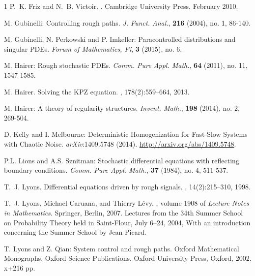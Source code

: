 \documentclass[11pt,reqno,oneside]{amsart}
\numberwithin{equation}{section}
\begin{document}
\begin{thebibliography}{1}
P.~K. Friz and N.~B. Victoir.
.
\newblock Cambridge University Press, February 2010.



M. Gubinelli: Controlling rough paths.  {\it J. Funct. Anal.},  {\bf 216}  (2004), no. 1, 86-140.



 M. Gubinelli, N. Perkowski and P. Imkeller: Paracontrolled distributions and singular PDEs. {\it Forum of Mathematics, Pi}, {\bf 3} (2015), no. 6.



M. Hairer: Rough stochastic PDEs.  {\it Comm. Pure Appl. Math.},  {\bf 64} (2011), no. 11, 1547-1585. 



M. Hairer.
\newblock Solving the {KPZ} equation.
, 178(2):559--664, 2013.



 M. Hairer: A theory of regularity structures. {\it Invent. Math.}, {\bf 198} (2014), no. 2, 269-504.

D. Kelly  and I. Melbourne: Deterministic Homogenization for Fast-Slow Systems with Chaotic Noise. {\it arXiv}:1409.5748 (2014). \url{http://arxiv.org/abs/1409.5748}.


 P.L. Lions and A.S. Sznitman: Stochastic differential equations with reflecting boundary conditions. {\it Comm. Pure Appl. Math.}, {\bf 37} (1984), no. 4, 511-537. 



T.~J. Lyons.
\newblock Differential equations driven by rough signals.
, 14(2):215--310, 1998.



T.~J. Lyons, Michael Caruana, and Thierry L{\'e}vy.
, volume 1908 of
  {\em Lecture Notes in Mathematics}.
\newblock Springer, Berlin, 2007.
\newblock Lectures from the 34th Summer School on Probability Theory held in
  Saint-Flour, July 6--24, 2004, With an introduction concerning the Summer
  School by Jean Picard.



T. Lyons and Z. Qian: System control and rough paths. Oxford Mathematical Monographs. Oxford Science Publications. Oxford University Press, Oxford, 2002. x+216 pp.




\end{thebibliography}
\end{document}
